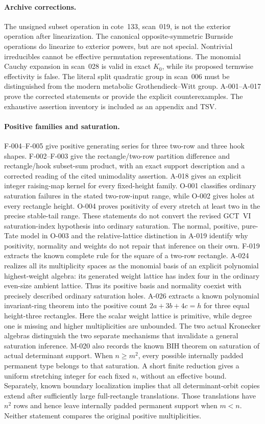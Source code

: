 \paragraph{Archive corrections.}
The unsigned subset operation in cote~133, scan~019, is not the
exterior operation after linearization. The canonical opposite-symmetric
Burnside operations do linearize to exterior powers, but are not
special. Nontrivial irreducibles cannot be effective permutation
representations. The monomial Cauchy expansion in scan~028 is valid
in exact \(K_0\), while its proposed termwise effectivity is false.
The literal split quadratic group in scan~006 must be distinguished
from the modern metabolic Grothendieck--Witt group. A-001--A-017
prove the corrected statements or provide the explicit counterexamples.
The exhaustive assertion inventory is included as an appendix and TSV.

\paragraph{Positive families and saturation.}
F-004--F-005 give positive generating series for three two-row
and three hook shapes. F-002--F-003 give the rectangle/two-row
partition difference and rectangle/hook subset-sum product, with an
exact support description and a corrected reading of the cited
unimodality assertion. A-018 gives an explicit integer raising-map
kernel for every fixed-height family. O-001 classifies ordinary
saturation failures in the stated two-row-input range, while O-002
gives holes at every rectangle height. O-004 proves positivity of
every stretch at least two in the precise stable-tail range.
These statements do not convert the revised GCT~VI saturation-index
hypothesis into ordinary saturation. The normal, positive, pure-Tate
model in O-003 and the relative-lattice distinction in A-019
identify why positivity, normality and weights do not repair that
inference on their own. F-019 extracts the known complete rule for
the square of a two-row rectangle. A-024 realizes all its multiplicity
spaces as the monomial basis of an explicit polynomial highest-weight
algebra: its generated weight lattice has index four in the ordinary
even-size ambient lattice. Thus its positive basis and normality
coexist with precisely described ordinary saturation holes.
A-026 extracts a known polynomial invariant-ring theorem into the
positive count \(2a+3b+4c=h\) for three equal height-three
rectangles. Here the scalar weight lattice is primitive, while
degree one is missing and higher multiplicities are unbounded.
The two actual Kronecker algebras distinguish the two separate
mechanisms that invalidate a general saturation inference.
M-020 also records the known BIH theorem on saturation of actual
determinant support. When \(n\geq m^2\), every possible internally
padded permanent type belongs to that saturation. A short finite
reduction gives a uniform stretching integer for each fixed \(n\),
without an effective bound. Separately, known boundary localization
implies that all determinant-orbit copies extend after sufficiently
large full-rectangle translations. Those translations have \(n^2\)
rows and hence leave internally padded permanent support when \(m<n\).
Neither statement compares the original positive multiplicities.

